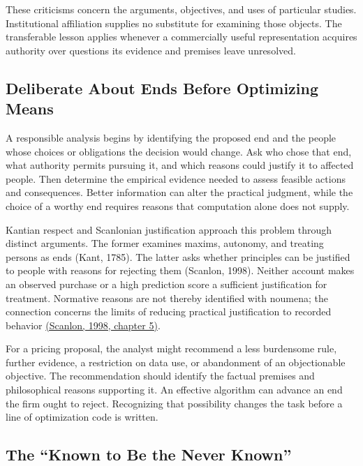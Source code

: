These criticisms concern the arguments, objectives, and uses of
particular studies. Institutional affiliation supplies no substitute for
examining those objects. The transferable lesson applies whenever a
commercially useful representation acquires authority over questions its
evidence and premises leave unresolved.

\hypertarget{M09-deliberate-about-ends-before-optimizing-means}{%
\subsection{Deliberate About Ends Before Optimizing
Means}\label{M09-deliberate-about-ends-before-optimizing-means}}

\noindent \noindent A responsible analysis begins by identifying the proposed end
and the people whose choices or obligations the decision would change.
Ask who chose that end, what authority permits pursuing it, and which
reasons could justify it to affected people. Then determine the
empirical evidence needed to assess feasible actions and consequences.
Better information can alter the practical judgment, while the choice of
a worthy end requires reasons that computation alone does not supply.

Kantian respect and Scanlonian justification approach this problem
through distinct arguments. The former examines maxims, autonomy, and
treating persons as ends (Kant, 1785). The latter asks whether
principles can be justified to people with reasons for rejecting them
(Scanlon, 1998). Neither account makes an observed purchase or a high
prediction score a sufficient justification for treatment. Normative
reasons are not thereby identified with noumena; the connection concerns
the limits of reducing practical justification to recorded behavior
\href{https://e-edu.nbu.bg/pluginfile.php/314831/mod_resource/content/0/scanlon_5.1-3.pdf}{(Scanlon,
1998, chapter 5)}.

For a pricing proposal, the analyst might recommend a less burdensome
rule, further evidence, a restriction on data use, or abandonment of an
objectionable objective. The recommendation should identify the factual
premises and philosophical reasons supporting it. An effective algorithm
can advance an end the firm ought to reject. Recognizing that
possibility changes the task before a line of optimization code is
written.

\hypertarget{M09-the-known-to-be-the-never-known}{%
\subsection{The ``Known to Be the Never
Known''}\label{M09-the-known-to-be-the-never-known}}

